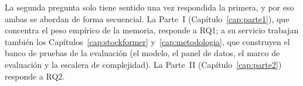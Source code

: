 La segunda pregunta solo tiene sentido una vez respondida la primera, y por eso ambas se
abordan de forma secuencial. La Parte~I (Capítulo~\ref{cap:parte1}), que concentra el
peso empírico de la memoria, responde a RQ1; a su servicio trabajan también los
Capítulos~\ref{cap:stockformer} y~\ref{cap:metodologia}, que construyen el banco de
pruebas de la evaluación (el modelo, el panel de datos, el marco de evaluación y la
escalera de complejidad). La Parte~II (Capítulo~\ref{cap:parte2}) responde a RQ2.